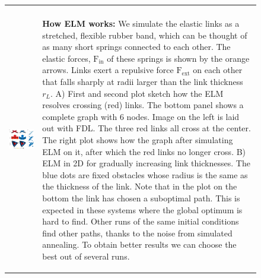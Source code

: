 \documentclass[nofootinbib,preprint,floatfix,endfloats]{revtex4} %
\begin{document}
{\begin{figure}
\begin{tabular}{ll}
\begin{minipage}{.3\textwidth}
\begin{spacing}{.5}
        \end{spacing}
          \end{minipage}
         \\
         \begin{minipage}{.7\columnwidth}
    \includegraphics[width = \columnwidth]{fig-09-19/elf-resolve-2d-1.png}
    \end{minipage}
         & 
         \begin{minipage}{.3\columnwidth}
         \raggedright
         \begin{spacing}{.5}
         {\scriptsize{\bf How ELM works:} We simulate the elastic links as a stretched, flexible rubber band, which can be thought of as many short springs connected to each other. The elastic forces, $\mathrm{F}_{\mathrm{in}}$ of these springs is shown by the orange arrows. Links exert a repulsive force $\mathrm{F}_{\mathrm{ext}}$  on each other that falls sharply at radii larger than the link thickness $r_L$. A) First and second plot sketch how the ELM resolves crossing (red) links. The bottom panel shows a complete graph with 6 nodes. Image on the left is laid out with FDL. The three red links all cross at the center. The right plot shows how the graph after simulating ELM on it, after which the red links no longer cross. B) ELM in 2D for gradually increasing link thicknesses. The blue dots are fixed obstacles whose radius is the same as the thickness of the link. Note that in the plot on the bottom the link has chosen a suboptimal path. This is  expected in these systems where the global optimum is hard to find. Other runs of the same initial conditions find other paths, thanks to the noise from simulated annealing. To obtain better results we can choose the best out of several runs.}
         
        \end{spacing}
    \end{minipage}
    \end{tabular}
    \label{fig:crossings}
\end{figure}




} %
\end{document}
